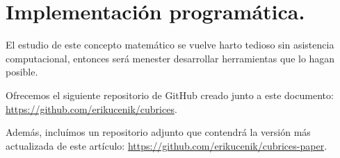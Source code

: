 \section{Implementación programática.}

El estudio de este concepto matemático se vuelve harto tedioso sin asistencia computacional, entonces será menester desarrollar herramientas que lo hagan posible.

Ofrecemos el siguiente repositorio de GitHub creado junto a este documento: \url{https://github.com/erikucenik/cubrices}.

Además, incluímos un repositorio adjunto que contendrá la versión más actualizada de este artículo: \url{https://github.com/erikucenik/cubrices-paper}.
